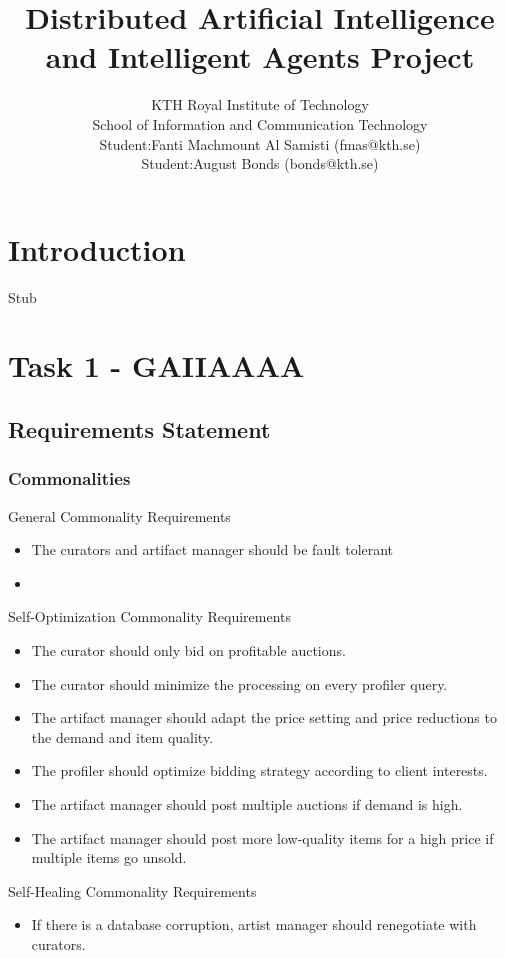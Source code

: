 \documentclass[a4paper, 11pt]{article}
\title{\textbf{Distributed Artificial Intelligence and Intelligent Agents Project}}
\author{KTH Royal Institute of Technology \\ 
		School of Information and Communication Technology \\
		Student:Fanti Machmount Al Samisti (fmas@kth.se) \\
		Student:August Bonds (bonds@kth.se)}
\begin{document}
	
\maketitle

\section{Introduction}

Stub

\section{Task 1 - GAIIAAAA}
\subsection{Requirements Statement}
\subsubsection{Commonalities}
General Commonality Requirements
\begin{itemize}
\item The curators and artifact manager should be fault tolerant
\item 
\end{itemize}
Self-Optimization Commonality Requirements

\begin{itemize}
\item The curator should only bid on profitable auctions.
\item The curator should minimize the processing on every profiler query.
\item The artifact manager should adapt the price setting and price reductions to the demand and item quality.
\item The profiler should optimize bidding strategy according to client interests.
\item The artifact manager should post multiple auctions if demand is high. 
\item The artifact manager should post more low-quality items for a high price if multiple items go unsold. 
\end{itemize}
Self-Healing Commonality Requirements
\begin{itemize}
\item If there is a database corruption, artist manager should renegotiate with curators. 
\end{itemize}
\end{document}
